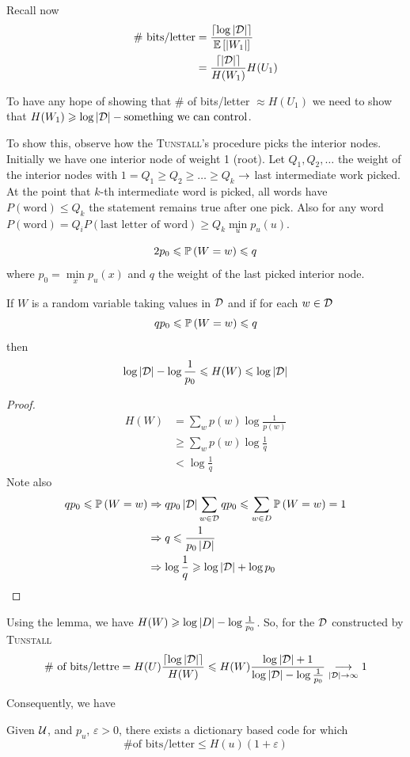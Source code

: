 Recall now 
\[
    \begin{aligned}
        \text{\# bits/letter} &= \frac{ \left\lceil \log\left\lvert\mathcal{D}\right\rvert \right\rceil}{\mathbb{E}\left[ \left\lvert W_1\right\rvert \right]}\\
        &= \frac{\left\lceil \left\lvert\mathcal{D}\right\rvert \right\rceil}{H(W_1)} H(U_1)
    \end{aligned}
\]

To have any hope of showing that \# of bits/letter $\approx H(U_1)$ we need to show that $H(W_1) \geqslant \log \left\lvert\mathcal{D}\right\rvert - \text{something we can control}$.

To show this, observe how the \textsc{Tunstall}'s procedure picks the interior nodes. Initially we have one interior node of weight 1 (root). Let $Q_1,Q_2,\ldots$ the weight of the interior nodes with $1=Q_1 \geqslant Q_2 \geqslant \ldots \geqslant Q_k$ $\rightarrow$ last intermediate work picked. At the point that $k$-th intermediate word is picked, all words have $P(\text{word}) \leqslant Q_k$ the statement remains true after one pick. Also for any word $P(\text{word}) = Q_i P(\text{last letter of word}) \geqslant Q_k \min\limits_up_u(u)$.

\[
    2p_0 \leqslant \mathbb{P}\left( W=w \right) \leqslant q
\]
where
$p_0= \min\limits_x p_u(x)$ and $q$ the weight of the last picked interior node.

\begin{lemma}
    If $W$ is a random variable taking values in $\mathcal{D}$ and if for each $w\in\mathcal{D}$
    \[
        qp_0 \leqslant \mathbb{P}\left( W=w \right)\leqslant q
    \]
    then
    \[
        \log \left\lvert\mathcal{D}\right\rvert  - \log \frac{1}{p_0} \leqslant H(W) \leqslant \log \left\lvert\mathcal{D}\right\rvert
    \]
\end{lemma}
\begin{proof}
    \[
        \begin{aligned}
            H(W) &= \sum\limits_w p(w) \log \frac{1}{p(w)}\\
            &\geqslant \sum_w p(w) \log \frac{1}{q}\\
            &< \log \frac{1}{q}
        \end{aligned}
    \]
    Note also
    \[
        \begin{aligned}           
            qp_0 \leqslant \mathbb{P}\left( W=w \right) &\Rightarrow qp_0\left\lvert\mathcal{D}\right\rvert\sum\limits_{w\in\mathcal{D}} qp_0 \leqslant \sum\limits_{w \in D}\mathbb{P}\left( W=w \right) = 1\\
            &\Rightarrow q\leqslant \frac{1}{p_0\left\lvert D\right\rvert}\\
            &\Rightarrow \log \frac{1}{q} \geqslant \log\left\lvert\mathcal{D}\right\rvert + \log p_0
        \end{aligned}
    \]
\end{proof}

Using the lemma, we have $H(W) \geqslant \log\left\lvert D\right\rvert - \log \frac{1}{p_0}$. So, for the $\mathcal{D}$ constructed by \textsc{Tunstall}
\[
    \text{\# of bits/lettre} = H(U) \frac{\left\lceil \log\left\lvert\mathcal{D}\right\rvert \right\rceil}{H(W)} \leqslant H(W) \frac{\log\left\lvert\mathcal{D}\right\rvert+1}{\log\left\lvert\mathcal{D}\right\rvert - \log\frac{1}{p_0}} \underset{\left\lvert\mathcal{D}\right\rvert \to \infty}{\longrightarrow} 1
\]

Consequently, we have
\begin{corollary}
    Given $\mathcal{U}$, and $p_u$, $\varepsilon > 0$, there exists a dictionary based code for which 
    \[
        \text{\# of bits/letter} \leqslant H(u)(1+\varepsilon)
    \]
\end{corollary}

